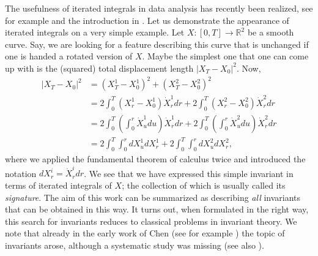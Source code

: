 \documentclass{scrartcl}
\theoremstyle{plain}
\theoremstyle{definition}
\newcommand{\R}{\mathbb{R}}
\newcommand{\1}[1]{1_{\{#1\}}}
\newcommand{\TODO}[1]{ \textbf{\color{Orange}(TODO #1)} }
\begin{document}
The usefulness of iterated integrals in data analysis has recently been realized,
see for example \cite{bib:LLN2012,bib:Gra2013,bib:KSHGL2017,bib:YLNSJC2017} and the introduction in \cite{bib:OxSigIntro}.
%
%
Let us demonstrate the appearance of iterated integrals on a very simple example.
Let $X: [0,T] \to \R^2$ be a smooth curve.
Say, we are looking for a feature describing this curve that is unchanged if one is handed a rotated version
of $X$. Maybe the simplest one that one can come up with is the (squared) total displacement length $|X_T - X_0|^2$.
Now,
\begin{align*}
  |X_T - X_0|^2
  &=
  (X^1_T - X^1_0)^2
  + 
  (X^2_T - X^2_0)^2 \\
  &=
  2 \int_0^T \left( X^1_r - X^1_0 \right) \dot X^1_r dr
  +
  2 \int_0^T \left( X^2_r - X^2_0 \right) \dot X^2_r dr \\
  &=
  2 \int_0^T \left( \int_0^r \dot X^1_u du \right) \dot X^1_r dr
  +
  2 \int_0^T \left( \int_0^r \dot X^2_u du \right) \dot X^2_r dr \\
  &=
  2 \int_0^T \int_0^r d X^1_u d X^1_r
  +
  2 \int_0^T \int_0^r d X^2_u d X^2_r,
\end{align*}
where we applied the fundamental theorem of calculus twice
and introduced the notation $dX^i_r = \dot{X}^i_r dr$.
%
We see that we have expressed this simple invariant in terms of iterated integrals of $X$;
the collection of which is usually called its \emph{signature}.
%
The aim of this work can be summarized as describing \emph{all} invariants that can be obtained in this way.
%
It turns out, when formulated in the right way, this search for invariants
reduces to classical problems in invariant theory.
We note that already in the early work of Chen (see for example \cite[Chapter 3]{bib:Che1957})
the topic of invariants arose, although a systematic study was missing (see also \cite{bib:Joh1962}).
%

\end{document}
